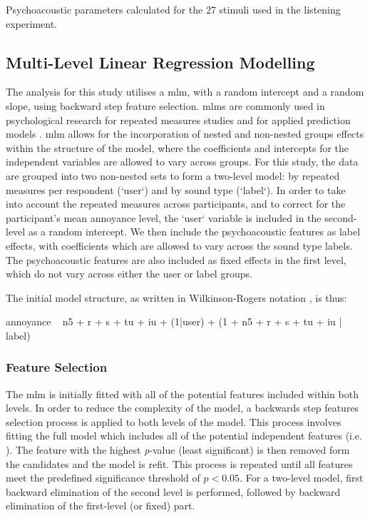\begin{table}
  \label{tab:sensor-stimuli}
  \centering
  \caption{Psychoacoustic parameters calculated for the 27 stimuli used in the listening experiment.}
\end{table}

\subsection{Multi-Level Linear Regression Modelling}

The analysis for this study utilises a \gls{mlm}, with a random intercept and a random slope, using backward step feature selection. \glspl{mlm} are commonly used in psychological research for repeated measures studies  and for applied prediction models . \gls{mlm} allows for the incorporation of nested and non-nested groups effects within the structure of the model, where the coefficients and intercepts for the independent variables are allowed to vary across groups. For this study, the data are grouped into two non-nested sets to form a two-level model: by repeated measures per respondent (`user`) and by sound type (`label`). In order to take into account the repeated measures across participants, and to correct for the participant's mean annoyance level, the `user` variable is included in the second-level as a random intercept. We then include the psychoacoustic features as label effects, with coefficients which are allowed to vary across the sound type labels. The psychoacoustic features are also included as fixed effects in the first level, which do not vary across either the user or label groups.

The initial model structure, as written in Wilkinson-Rogers notation , is thus:

annoyance ~ \gls{n5} + \gls{r} + \gls{s} + \gls{tu} + \gls{iu} + (1|user) + (1 + \gls{n5} + \gls{r} + \gls{s} + \gls{tu} + \gls{iu} | label)

\subsubsection{Feature Selection}

The \gls{mlm} is initially fitted with all of the potential features included within both levels. In order to reduce the complexity of the model, a backwards step features selection process is applied to both levels of the model. This process involves fitting the full model which includes all of the potential independent features (i.e. ). The feature with the highest \emph{p}-value (least significant) is then removed form the candidates and the model is refit. This process is repeated until all features meet the predefined significance threshold of $p < 0.05 $. For a two-level model, first backward elimination of the second level is performed, followed by backward elimination of the first-level (or fixed) part.

